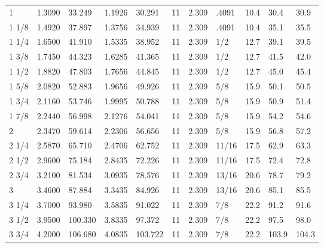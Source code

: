 \begin{table}[h!]
\begin{longtable}{l|ll|ll|ll|ll|ll}
         1&    1.3090&    33.249&    1.1926&    30.291&        11&     2.309&     .4091&      10.4&      30.4&      30.9\\
     1 1/8&    1.4920&    37.897&    1.3756&    34.939&        11&     2.309&     .4091&      10.4&      35.1&      35.5\\
     1 1/4&    1.6500&    41.910&    1.5335&    38.952&        11&     2.309&       1/2&      12.7&      39.1&      39.5\\
     1 3/8&    1.7450&    44.323&    1.6285&    41.365&        11&     2.309&       1/2&      12.7&      41.5&      42.0\\
     1 1/2&    1.8820&    47.803&    1.7656&    44.845&        11&     2.309&       1/2&      12.7&      45.0&      45.4\\
     1 5/8&    2.0820&    52.883&    1.9656&    49.926&        11&     2.309&       5/8&      15.9&      50.1&      50.5\\
     1 3/4&    2.1160&    53.746&    1.9995&    50.788&        11&     2.309&       5/8&      15.9&      50.9&      51.4\\
     1 7/8&    2.2440&    56.998&    2.1276&    54.041&        11&     2.309&       5/8&      15.9&      54.2&      54.6\\
         2&    2.3470&    59.614&    2.2306&    56.656&        11&     2.309&       5/8&      15.9&      56.8&      57.2\\
     2 1/4&    2.5870&    65.710&    2.4706&    62.752&        11&     2.309&     11/16&      17.5&      62.9&      63.3\\
     2 1/2&    2.9600&    75.184&    2.8435&    72.226&        11&     2.309&     11/16&      17.5&      72.4&      72.8\\
     2 3/4&    3.2100&    81.534&    3.0935&    78.576&        11&     2.309&     13/16&      20.6&      78.7&      79.2\\
         3&    3.4600&    87.884&    3.3435&    84.926&        11&     2.309&     13/16&      20.6&      85.1&      85.5\\
     3 1/4&    3.7000&    93.980&    3.5835&    91.022&        11&     2.309&       7/8&      22.2&      91.2&      91.6\\
     3 1/2&    3.9500&   100.330&    3.8335&    97.372&        11&     2.309&       7/8&      22.2&      97.5&      98.0\\
     3 3/4&    4.2000&   106.680&    4.0835&   103.722&        11&     2.309&       7/8&      22.2&     103.9&     104.3\\

\end{longtable}
\end{table}
